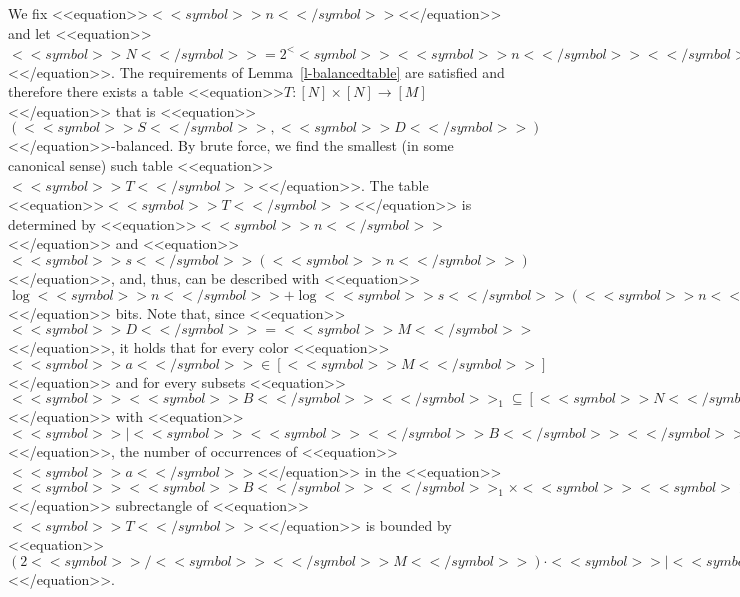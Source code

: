 \documentclass[proceedings]{stacs}
\def\mapping{\rightarrow}
\begin{document}
\proof
We fix <<equation>>$<<symbol>>n<</symbol>>$<</equation>> and let <<equation>>$<<symbol>>N<</symbol>>=2^<<symbol>><<symbol>>n<</symbol>><</symbol>>, <<symbol>>m<</symbol>> = <<symbol>>s<</symbol>>(<<symbol>>n<</symbol>>)<<symbol>>/<</symbol>>2 - 7 \log <<symbol>>n<</symbol>>, <<symbol>>M<</symbol>>= 2^<<symbol>><<symbol>>m<</symbol>><</symbol>>, <<symbol>>S<</symbol>>= 2^{<<symbol>><<symbol>>s<</symbol>>(<<symbol>>n<</symbol>>)<<symbol>>/<</symbol>><</symbol>>2}, <<symbol>>D<</symbol>>=<<symbol>>M<</symbol>>, <<symbol>>t<</symbol>>= <<symbol>>\alpha<</symbol>>(<<symbol>>n<</symbol>>) + 11 \log <<symbol>>n<</symbol>>$<</equation>>. The requirements of Lemma~\ref{l-balancedtable} are satisfied and therefore there exists a table <<equation>>$T: [N] \times [N] \mapping [M]$<</equation>> that is <<equation>>$(<<symbol>>S<</symbol>>,<<symbol>>D<</symbol>>)$<</equation>>-balanced. By brute force, we find the smallest (in some canonical sense) such table <<equation>>$<<symbol>>T<</symbol>>$<</equation>>. The table <<equation>>$<<symbol>>T<</symbol>>$<</equation>> is determined by <<equation>>$<<symbol>>n<</symbol>>$<</equation>> and <<equation>>$<<symbol>>s<</symbol>>(<<symbol>>n<</symbol>>)$<</equation>>, and, thus, can be described with <<equation>>$\log <<symbol>>n<</symbol>> + \log <<symbol>>s<</symbol>>(<<symbol>>n<</symbol>>) + <<symbol>>O<</symbol>>(1)$<</equation>> bits. Note that, since <<equation>>$<<symbol>>D<</symbol>>=<<symbol>>M<</symbol>>$<</equation>>, it holds that for every color <<equation>>$<<symbol>>a<</symbol>> \in [<<symbol>>M<</symbol>>]$<</equation>> and for every subsets <<equation>>$<<symbol>><<symbol>>B<</symbol>><</symbol>>_1 \subseteq [<<symbol>>N<</symbol>>], <<symbol>><<symbol>>B<</symbol>><</symbol>>_2 \subseteq [<<symbol>>N<</symbol>>]$<</equation>> with
<<equation>>$<<symbol>>|<<symbol>><<symbol>><</symbol>>B<</symbol>><</symbol>>_1<<symbol>>|<</symbol>> \geq <<symbol>>S<</symbol>>, <<symbol>>|<<symbol>><<symbol>><</symbol>>B<</symbol>><</symbol>>_2<<symbol>>|<</symbol>> \geq <<symbol>>S<</symbol>>$<</equation>>, the number of occurrences of <<equation>>$<<symbol>>a<</symbol>>$<</equation>> in the <<equation>>$<<symbol>><<symbol>>B<</symbol>><</symbol>>_1 \times <<symbol>><<symbol>>B<</symbol>><</symbol>>_2$<</equation>> subrectangle of <<equation>>$<<symbol>>T<</symbol>>$<</equation>> is bounded by <<equation>>$(2<<symbol>>/<<symbol>><</symbol>>M<</symbol>>) \cdot <<symbol>>|<<symbol>><<symbol>><</symbol>>B<</symbol>><</symbol>>_1 \times <<symbol>><<symbol>>B<</symbol>><</symbol>>_2<<symbol>>|<</symbol>>$<</equation>>.
\end{document}
